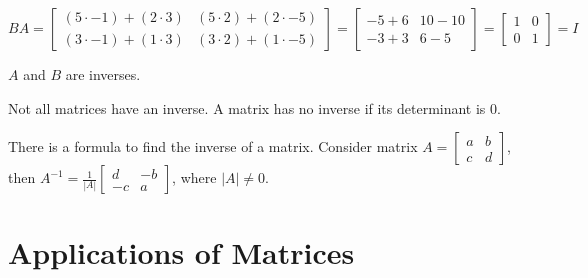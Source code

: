 \documentclass{report}
\begin{document}
$
    BA=
    \begin{bmatrix}
        (5 \cdot -1)+(2 \cdot 3) & (5 \cdot 2)+(2 \cdot -5) \\
        (3 \cdot -1)+(1 \cdot 3) & (3 \cdot 2)+(1 \cdot -5)
    \end{bmatrix}
    =
    \begin{bmatrix}
        -5+6 & 10-10 \\
        -3+3 & 6-5
    \end{bmatrix}
    =
    \begin{bmatrix}
        1 & 0 \\
        0 & 1
    \end{bmatrix}
    =I
$

$A$ and $B$ are inverses.

Not all matrices have an inverse. A matrix has no inverse if its determinant is 0.

There is a formula to find the inverse of a matrix. Consider matrix 
$
    A=
    \begin{bmatrix}
        a & b \\
        c & d
    \end{bmatrix}
$, then 
$
    A^{-1}=\frac{1}{|A|}
    \begin{bmatrix}
        d & -b \\
        -c & a
    \end{bmatrix}
$, 
where $|A| \neq 0$.


\chapter{Applications of Matrices}
\end{document}
